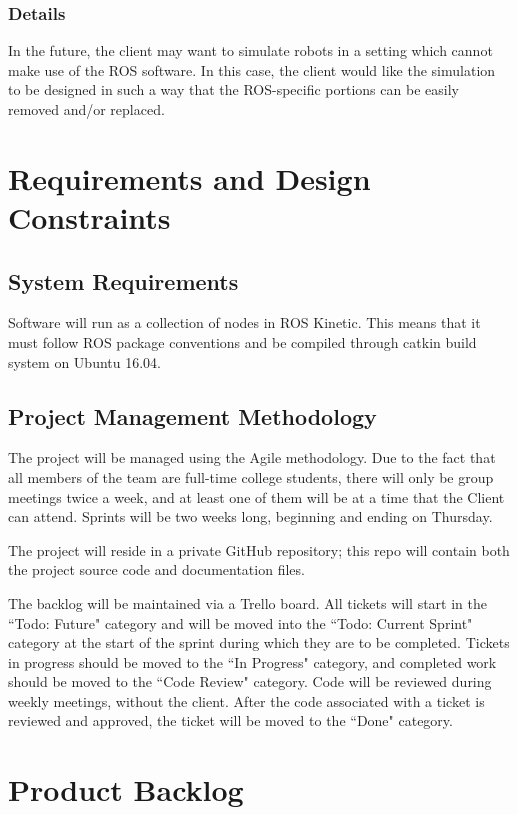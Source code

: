 \subsubsection{Details}
In the future, the client may want to simulate robots in a setting which cannot make use of the ROS software. In this case, the client would like the simulation to be designed in such a way that the ROS-specific portions can be easily removed and/or replaced.

\section{Requirements and Design Constraints}
\subsection{System  Requirements}
Software will run as a collection of nodes in ROS Kinetic. This means that it must follow ROS package conventions and be compiled through catkin build system on Ubuntu 16.04.

\subsection{Project  Management Methodology}
The project will be managed using the Agile methodology. Due to the fact that all members of the team are full-time college students, there will only be group meetings twice a week, and at least one of them will be at a time that the Client can attend. Sprints will be two weeks long, beginning and ending on Thursday.

The project will reside in a private GitHub repository; this repo will contain both the project source code and documentation files.

The backlog will be maintained via a Trello board. All tickets will start in the ``Todo: Future" category and will be moved into the ``Todo: Current Sprint" category at the start of the sprint during which they are to be completed. Tickets in progress should be moved to the ``In Progress" category, and completed work should be moved to the ``Code Review" category. Code will be reviewed during weekly meetings, without the client. After the code associated with a ticket is reviewed and approved, the ticket will be moved to the ``Done" category.

\section{Product Backlog}
 
